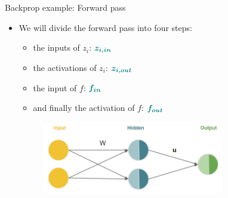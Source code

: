     \begin{vbframe}{Backprop example: Forward pass}

  \begin{itemize}
    \item We will divide the forward pass into four steps:
      \begin{itemize}
        \item the inputs of $z_i$: $\bm{\textcolor{teal}{z_{i,in}}}$
        \item the activations of $z_i$: $\bm{\textcolor{teal}{z_{i,out}}}$
        \item the input of $f$: $\bm{\textcolor{teal}{f_{in}}}$
        \item and finally the activation of $f$: $\bm{\textcolor{teal}{f_{out}}}$
      \end{itemize}

    \begin{figure}
      \centering
        \includegraphics[width=8cm]{plots/xor_rep.png}%
    \end{figure}


\end{itemize}
\end{vbframe}
